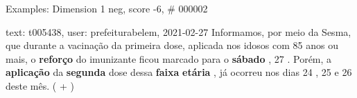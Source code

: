 \begin{frame}{Examples: Dimension 1 neg, score -6, \# 000002}
\footnotesize
\begin{alertblock}{text: t005438, user: prefeiturabelem, 2021-02-27}
Informamos, por meio da Sesma, que durante a vacinação da primeira dose, 
aplicada nos idosos com 85 anos ou mais, o \textbf{reforço} do imunizante ficou 
marcado para o \textbf{sábado} , 27 . Porém, a \textbf{aplicação} da 
\textbf{segunda} dose dessa \textbf{faixa} \textbf{etária} , já ocorreu nos 
dias 24 , 25 e 26 deste mês. ( + ) 
\end{alertblock}
\end{frame}
